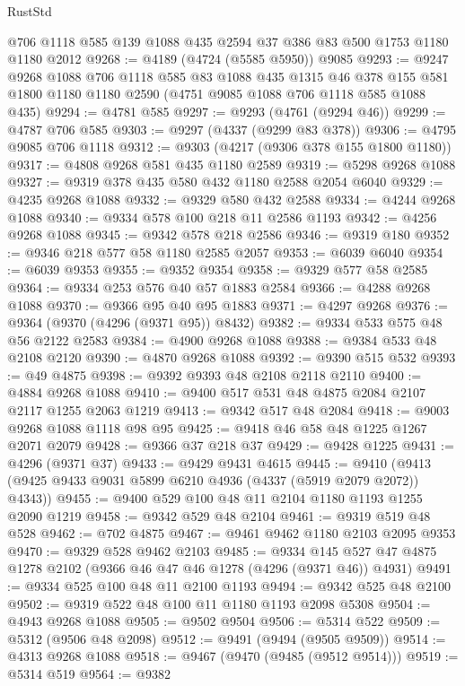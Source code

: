 \begin{lexlean}{RustStd}
\begin{coremodule}
    @706
    @1118
    @585
    @139
    @1088
    @435
    @2594
    @37
    @386
    @83
    @500
    @1753
    @1180
    @1180
    @2012
@9268 := @4189 (@4724 (@5585 @5950)) @9085
@9293 := @9247
    @9268
    @1088
    @706
    @1118
    @585
    @83
    @1088
    @435
    @1315
    @46
    @378
    @155
    @581
    @1800
    @1180
    @1180
    @2590
    (@4751 @9085 @1088 @706 @1118 @585 @1088 @435)
@9294 := @4781 @585
@9297 := @9293 (@4761 (@9294 @46))
@9299 := @4787 @706 @585
@9303 := @9297 (@4337 (@9299 @83 @378))
@9306 := @4795 @9085 @706 @1118
@9312 := @9303 (@4217 (@9306 @378 @155 @1800 @1180))
@9317 := @4808 @9268 @581 @435 @1180 @2589
@9319 := @5298 @9268 @1088
@9327 := @9319 @378 @435 @580 @432 @1180 @2588 @2054 @6040
@9329 := @4235 @9268 @1088
@9332 := @9329 @580 @432 @2588
@9334 := @4244 @9268 @1088
@9340 := @9334 @578 @100 @218 @11 @2586 @1193
@9342 := @4256 @9268 @1088
@9345 := @9342 @578 @218 @2586
@9346 := @9319 @180
@9352 := @9346 @218 @577 @58 @1180 @2585 @2057
@9353 := @6039 @6040
@9354 := @6039 @9353
@9355 := @9352 @9354
@9358 := @9329 @577 @58 @2585
@9364 := @9334 @253 @576 @40 @57 @1883 @2584
@9366 := @4288 @9268 @1088
@9370 := @9366 @95 @40 @95 @1883
@9371 := @4297 @9268
@9376 := @9364 (@9370 (@4296 (@9371 @95)) @8432)
@9382 := @9334 @533 @575 @48 @56 @2122 @2583
@9384 := @4900 @9268 @1088
@9388 := @9384 @533 @48 @2108 @2120
@9390 := @4870 @9268 @1088
@9392 := @9390 @515 @532
@9393 := @49 @4875
@9398 := @9392 @9393 @48 @2108 @2118 @2110
@9400 := @4884 @9268 @1088
@9410 := @9400 @517 @531 @48 @4875 @2084 @2107 @2117 @1255 @2063 @1219
@9413 := @9342 @517 @48 @2084
@9418 := @9003 @9268 @1088 @1118 @98 @95
@9425 := @9418 @46 @58 @48 @1225 @1267 @2071 @2079
@9428 := @9366 @37 @218 @37
@9429 := @9428 @1225
@9431 := @4296 (@9371 @37)
@9433 := @9429 @9431 @4615
@9445 := @9410 (@9413 (@9425 @9433 @9031 @5899 @6210 @4936 (@4337 (@5919 @2079 @2072)) @4343))
@9455 := @9400 @529 @100 @48 @11 @2104 @1180 @1193 @1255 @2090 @1219
@9458 := @9342 @529 @48 @2104
@9461 := @9319 @519 @48 @528
@9462 := @702 @4875
@9467 := @9461 @9462 @1180 @2103 @2095 @9353
@9470 := @9329 @528 @9462 @2103
@9485 := @9334 @145 @527 @47 @4875 @1278 @2102 (@9366 @46 @47 @46 @1278 (@4296 (@9371 @46)) @4931)
@9491 := @9334 @525 @100 @48 @11 @2100 @1193
@9494 := @9342 @525 @48 @2100
@9502 := @9319 @522 @48 @100 @11 @1180 @1193 @2098 @5308
@9504 := @4943 @9268 @1088
@9505 := @9502 @9504
@9506 := @5314 @522
@9509 := @5312 (@9506 @48 @2098)
@9512 := @9491 (@9494 (@9505 @9509))
@9514 := @4313 @9268 @1088
@9518 := @9467 (@9470 (@9485 (@9512 @9514)))
@9519 := @5314 @519
@9564 := @9382

\end{coremodule}
\end{lexlean}
